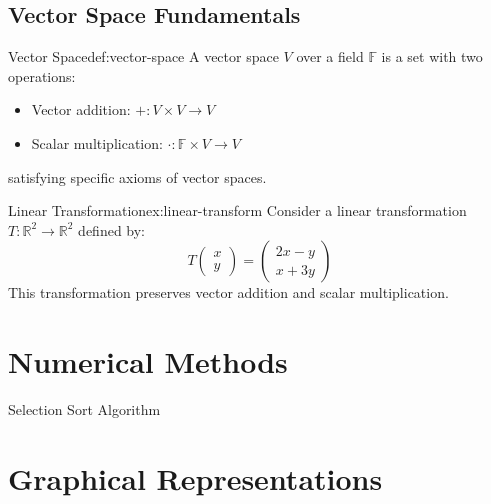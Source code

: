 \documentclass[12pt,a4paper]{article}
\begin{document}
\subsection{Vector Space Fundamentals}
\begin{Definition}{Vector Space}{def:vector-space}
    A vector space $V$ over a field $\mathbb{F}$ is a set with two operations:
    \begin{itemize}
        \item Vector addition: $+: V \times V \to V$
        \item Scalar multiplication: $\cdot: \mathbb{F} \times V \to V$
    \end{itemize}
    satisfying specific axioms of vector spaces.
\end{Definition}

\begin{Example}{Linear Transformation}{ex:linear-transform}
    Consider a linear transformation $T: \mathbb{R}^2 \to \mathbb{R}^2$ defined by:
    \[T\begin{pmatrix}x \\ y\end{pmatrix} = \begin{pmatrix}2x - y \\ x + 3y\end{pmatrix}\]
    This transformation preserves vector addition and scalar multiplication.
\end{Example}

\section{Numerical Methods}

\begin{algorithm}[H]
    \SetAlgoLined
    \caption{Selection Sort Algorithm}
\end{algorithm}

\section{Graphical Representations}
\end{document}
